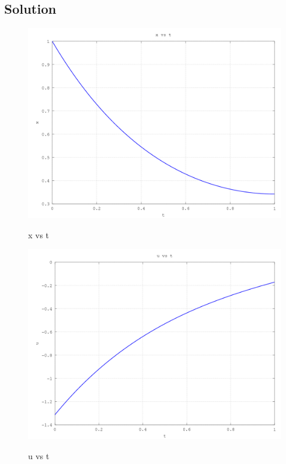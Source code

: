 \documentclass[10pt,a4paper]{article}
\begin{document}
\subsection*{Solution}

\begin{center}
	\begin{figure}[H]
			  \includegraphics[scale=0.5]{figures/Question4X.png} 
	          \label{fig:Q4X}
	\caption{ x vs t}
	\end{figure}
	
	\begin{figure}[H]
			  \includegraphics[scale=0.5]{figures/Question4U.png} 
	          \label{fig:Q4U}
	\caption{ u vs t}
	\end{figure}


\end{center}
\end{document}
